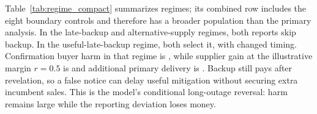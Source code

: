 \documentclass[preprint,11pt,authoryear]{elsarticle}
\begin{document}
Table~\ref{tab:regime_compact} summarizes regimes; its combined row includes the eight boundary controls and therefore has a broader population than the primary analysis. In the late-backup and alternative-supply regimes, both reports skip backup. In the useful-late-backup regime, both select it, with changed timing. Confirmation buyer harm in that regime is , while supplier gain at the illustrative margin $r=0.5$ is  and additional primary delivery is . Backup still pays after revelation, so a false notice can delay useful mitigation without securing extra incumbent sales. This is the model's conditional long-outage reversal: harm remains large while the reporting deviation loses money.
\end{document}
